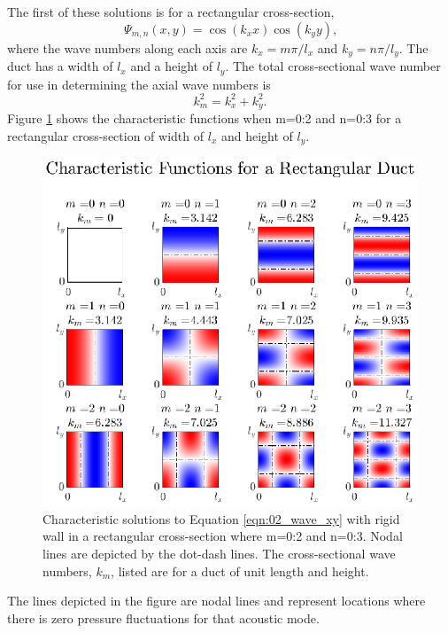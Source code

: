 The first of these solutions is for a rectangular cross-section,
\begin{equation}
  \Psi_{m,n}(x,y) = \cos(k_xx)\cos(k_yy) \textrm{,}
  \label{eqn:02_psi_rect}
\end{equation}
where the wave numbers along each axis are $k_x = m\pi/l_x$ and $k_y = n\pi/l_y$.
The duct has a width of $l_x$ and a height of $l_y$.
The total cross-sectional wave number for use in determining the axial wave numbers is
\begin{equation}
  k_m^2 = k_x^2+k_y^2 \textrm{.}
  \label{eqn:02_wave_number_crosssection}
\end{equation}
Figure \ref{fig:02_cross_section_rect} shows the characteristic functions when m=0:2 and n=0:3 for a rectangular cross-section of width of $l_x$ and height of $l_y$.
\begin{figure}
  \centering
  \includegraphics{../matlab/02_background/cross_section_rect.eps}
  \caption{Characteristic solutions to Equation \ref{eqn:02_wave_xy} with rigid wall in a rectangular cross-section where m=0:2 and n=0:3.  Nodal lines are depicted by the dot-dash lines.  The cross-sectional wave numbers, $k_m$, listed are for a duct of unit length and height.}
  \label{fig:02_cross_section_rect}
\end{figure}
The lines depicted in the figure are nodal lines and represent locations where there is zero pressure fluctuations for that acoustic mode.

